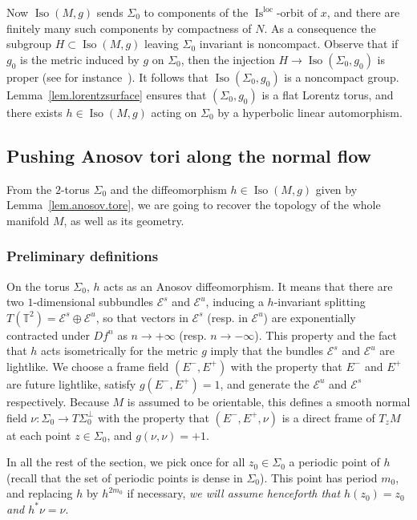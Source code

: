 \documentclass[11pt]{article}
\theoremstyle{definition}
\numberwithin{equation}{section}
\numberwithin{figure}{section}
\numberwithin{table}{section}
\DeclareMathOperator{\Iso}{Iso}
\DeclareMathOperator{\Is}{Is}
\DeclareMathOperator{\loc}{loc}
\newcommand*\TT{\mathbb{T}}
\begin{document}
Now $\Iso(M,g)$ sends $\Sigma_0$ to components of the $\Is^{\loc}$-orbit of $x$, and there are finitely many such components by compactness of $N$. As a consequence the subgroup $H \subset \Iso(M,g)$ leaving $\Sigma_0$ invariant is noncompact. Observe that if $g_0$ is the metric induced by $g$ on $\Sigma_0$, then the injection $H \to \Iso(\Sigma_0,g_0)$ is proper (see for instance~\cite[Proposition~3.6]{zeghibflot}). It follows that $\Iso(\Sigma_0,g_0)$ is a noncompact group. Lemma~\ref{lem.lorentzsurface} ensures that $(\Sigma_0,g_0)$ is a flat Lorentz torus, and there exists $h \in \Iso(M,g)$ acting on $\Sigma_0$ by a hyperbolic linear automorphism.



\subsection{Pushing Anosov tori along the normal flow}\label{sec.anosov.mapping}
From the $2$-torus $\Sigma_0$ and the diffeomorphism $h \in \Iso(M,g)$ given by Lemma~\ref{lem.anosov.tore}, we are going to recover the topology of the whole manifold $M$, as well as its geometry.



\subsubsection{Preliminary definitions}\label{sec.push}
On the torus $\Sigma_0$, $h$ acts as an Anosov diffeomorphism. It means that there are two $1$-dimensional subbundles ${\mathcal E}^s$ and ${\mathcal E}^u$, inducing a $h$-invariant splitting $T(\TT^2)={\mathcal E}^s \oplus {\mathcal E}^u$, so that vectors in ${\mathcal E}^s$ (resp. in ${\mathcal E}^u$) are exponentially contracted under $Df^n$ as $n \to + \infty$ (resp. $n \to - \infty$). This property and the fact that $h$ acts isometrically for the metric $g$ imply that the bundles ${\mathcal E}^s$ and ${\mathcal E}^u$ are lightlike. We choose a frame field $(E^-,E^+)$ with the property that $E^-$ and $E^+$ are future lightlike, satisfy $g(E^-,E^+)=1$, and generate the ${\mathcal E}^u$ and ${\mathcal E}^s$ respectively. Because $M$ is assumed to be orientable, this defines a smooth normal field $\nu: \Sigma_0 \to T\Sigma_0^{\perp}$ with the property that $(E^-,E^+,\nu)$ is a direct frame of $T_zM$ at each point $z \in \Sigma_0$, and $g(\nu,\nu)=+1$.



In all the rest of the section, we pick once for all $z_0 \in \Sigma_0$ a periodic point of $h$ (recall that the set of periodic points is dense in $\Sigma_0$). This point has period $m_0$, and replacing $h$ by $h^{2m_0}$ if necessary, \emph{we will assume henceforth that $h(z_0)=z_0$ and $h^* \nu =\nu$}.
\end{document}
